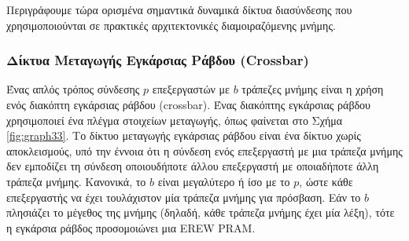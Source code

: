 \documentclass[12pt,a4paper]{article}
\begin{document}
Περιγράφουμε τώρα ορισμένα σημαντικά δυναμικά δίκτυα διασύνδεσης που
χρησιμοποιούνται σε πρακτικές αρχιτεκτονικές διαμοιραζόμενης μνήμης.

\subsubsection{Δίκτυα Μεταγωγής Εγκάρσιας Ράβδου (\foreignlanguage{english}{Crossbar})}
Ένας απλός τρόπος σύνδεσης $p$ επεξεργαστών με $b$ τράπεζες μνήμης είναι η χρήση
ενός διακόπτη εγκάρσιας ράβδου (\foreignlanguage{english}{crossbar}). Ένας διακόπτης
εγκάρσιας ράβδου χρησιμοποιεί ένα πλέγμα στοιχείων μεταγωγής,
όπως φαίνεται στο Σχήμα \ref{fig:graph33}. Το δίκτυο μεταγωγής εγκάρσιας ράβδου
είναι ένα δίκτυο χωρίς αποκλεισμούς, υπό την έννοια ότι η σύνδεση ενός επεξεργαστή
με μια τράπεζα μνήμης δεν εμποδίζει τη σύνδεση οποιουδήποτε άλλου επεξεργαστή με
οποιαδήποτε άλλη τράπεζα μνήμης. Κανονικά, το $b$ είναι μεγαλύτερο ή ίσο με το $p$,
ώστε κάθε επεξεργαστής να έχει τουλάχιστον μία τράπεζα μνήμης για πρόσβαση. Εάν
το $b$ πλησιάζει το μέγεθος της μνήμης (δηλαδή, κάθε τράπεζα μνήμης έχει μία λέξη),
τότε η εγκάρσια ράβδος προσομοιώνει μια
\foreignlanguage{english}{EREW PRAM}.
\end{document}
